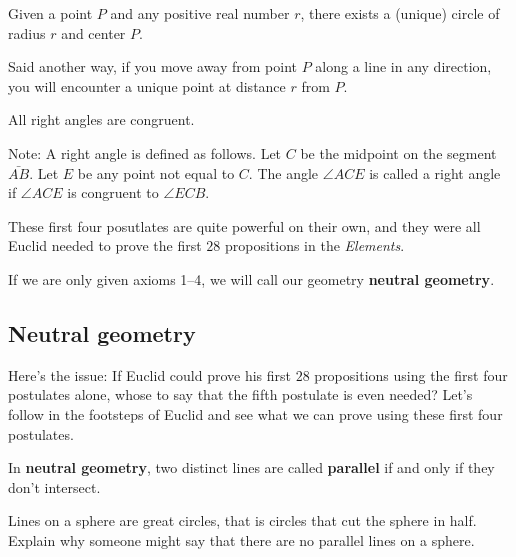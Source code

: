 \documentclass[noauthor,nooutcomes,12pt,hints]{ximera}
\begin{document}
\begin{axiom}
Given a point $P$ and any positive real number $r$, there exists a
(unique) circle of radius $r$ and center $P$. 

Said another way, if you move away from point $P$ along a line in any
direction, you will encounter a unique point at distance $r$ from $P$.
\end{axiom}

\begin{axiom}
All right angles are congruent.

Note: A right angle is defined as follows. Let $C$ be the midpoint on
the segment $\bar{AB}$. Let $E$ be any point not equal to
$C$. The angle $\angle ACE$ is called a right angle if $\angle ACE$ is
congruent to $\angle ECB$. 
\end{axiom}

These first four posutlates are quite powerful on their own, and they
were all Euclid needed to prove the first $28$ propositions in the
\textit{Elements}.


\begin{definition}
If we are only given axioms 1--4, we will call our geometry
\textbf{neutral geometry}.
\end{definition}





\subsection{Neutral geometry}


Here's the issue: If Euclid could prove his first $28$ propositions
using the first four postulates alone, whose to say that the fifth
postulate is even needed?  Let's follow in the footsteps of Euclid and
see what we can prove using these first four postulates.



\begin{definition}
In \textbf{neutral geometry}, two distinct lines are called \textbf{parallel} if and
only if they don't intersect.
\end{definition}



\begin{problem}
 Lines on a sphere are great circles, that is circles that cut the
 sphere in half. Explain why someone might say that there are no
 parallel lines on a sphere.
\end{problem}
   
\end{document}

